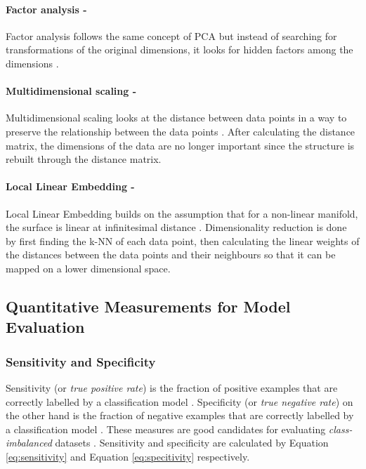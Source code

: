 \documentclass{article}[paper=a4,pagesize=auto,10pt]
\begin{document}
\paragraph{Factor analysis -}

Factor analysis follows the same concept of PCA but instead of searching for transformations of the original dimensions, it looks for hidden factors among the dimensions \cite{garcia2015data}.

\paragraph{Multidimensional scaling -}

Multidimensional scaling looks at the distance between data points in a way to preserve the relationship between the data points \cite{garcia2015data}. After calculating the distance matrix, the dimensions of the data are no longer important since the structure is rebuilt through the distance matrix.

\paragraph{Local Linear Embedding -}

Local Linear Embedding builds on the assumption that for a non-linear manifold, the surface is linear at infinitesimal distance \cite{garcia2015data}. Dimensionality reduction is done by first finding the k-NN of each data point, then calculating the linear weights of the distances between the data points and their neighbours so that it can be mapped on a lower dimensional space.

\subsection{Quantitative Measurements for Model Evaluation} \label{Quantitative Measurements for Model Evaluation}

\subsubsection{Sensitivity and Specificity} \label{Sensitivity and Specificity}

Sensitivity (or \textit{true positive rate}) is the fraction of positive examples that are correctly labelled by a classification model \cite{sammut2017encyclopedia}. Specificity (or \textit{true negative rate}) on the other hand is the fraction of negative examples that are correctly labelled by a classification model \cite{sammut2017encyclopedia}. These measures are good candidates for evaluating \textit{class-imbalanced} datasets \cite{han2011data}. Sensitivity and specificity are calculated by Equation \ref{eq:sensitivity} and Equation \ref{eq:specitivity} respectively.
\end{document}
